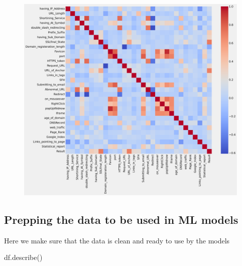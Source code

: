 \documentclass[
  letterpaper,
  DIV=11,
  numbers=noendperiod]{scrartcl}
\newenvironment{Shaded}{\begin{snugshade}}{\end{snugshade}}
\newcommand{\NormalTok}[1]{\textcolor[rgb]{0.00,0.23,0.31}{#1}}
\begin{document}
\begin{figure}[H]

{\centering \includegraphics{project_files/figure-pdf/cell-6-output-1.svg}

}

\end{figure}

\hypertarget{prepping-the-data-to-be-used-in-ml-models}{%
\subsection{Prepping the data to be used in ML
models}\label{prepping-the-data-to-be-used-in-ml-models}}

Here we make sure that the data is clean and ready to use by the models

\begin{Shaded}
\begin{Highlighting}[]
\NormalTok{df.describe()}
\end{Highlighting}
\end{Shaded}
\end{document}
